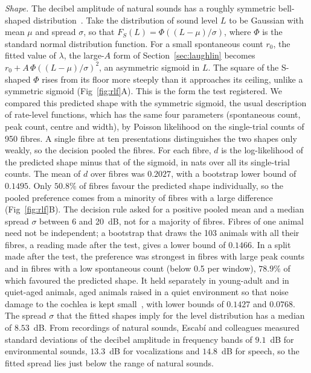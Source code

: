 \documentclass[10pt,letterpaper]{article}
\begin{document}
\emph{Shape.} The decibel amplitude of natural sounds has a roughly symmetric bell-shaped distribution~\cite{Escabi2003}. Take the
distribution of sound level $L$ to be Gaussian with mean $\mu$ and spread $\sigma$, so that $F_S(L)=\Phi((L-\mu)/\sigma)$, where $\Phi$
is the standard normal distribution function. For a small spontaneous count $r_0$, the fitted value of $\lambda$, the large-$A$ form of Section~\ref{sec:laughlin}
becomes $r_0+A\,\Phi((L-\mu)/\sigma)^2$, an asymmetric sigmoid in $L$. The square of the S-shaped $\Phi$ rises from its floor more steeply than it
approaches its ceiling, unlike a symmetric sigmoid (Fig~\ref{fig:rlf}A). This is the form the test registered. We compared this predicted
shape with the symmetric sigmoid, the usual description of rate-level functions, which has the same four parameters (spontaneous count, peak count, centre and width),
by Poisson likelihood on the single-trial counts of 950 fibres. A single fibre at ten presentations distinguishes the two shapes only
weakly, so the decision pooled the fibres. For each fibre, $d$ is the log-likelihood of the predicted shape minus that of the sigmoid, in nats over all its
single-trial counts. The mean of $d$ over fibres was $0.2027$, with a bootstrap lower bound of $0.1495$. Only $50.8\%$ of fibres favour the predicted shape individually, so the pooled preference comes
from a minority of fibres with a large difference (Fig~\ref{fig:rlf}B). The decision rule asked for a positive pooled mean and
a median spread $\sigma$ between 6 and 20~dB, not for a majority of fibres. Fibres of one animal need not be independent; a
bootstrap that draws the 103 animals with all their fibres, a reading made after the test, gives a lower bound of $0.1466$. In a split made after the test, the preference was strongest in fibres with large peak counts and in fibres with a low
spontaneous count (below 0.5 per window), $78.9\%$ of which favoured the predicted shape. It held separately in young-adult and in quiet-aged animals, aged animals raised in a quiet
environment so that noise damage to the cochlea is kept small~\cite{Heeringa2024}, with lower bounds of $0.1427$ and $0.0768$. The
spread $\sigma$ that the fitted shapes imply for the level distribution has a median of $8.53$~dB. From recordings of natural sounds,
Escab\'i and colleagues measured standard deviations of the decibel amplitude in frequency bands of $9.1$~dB for environmental
sounds, $13.3$~dB for vocalizations and $14.8$~dB for speech, so the fitted spread lies just below the range of natural sounds.
\end{document}
